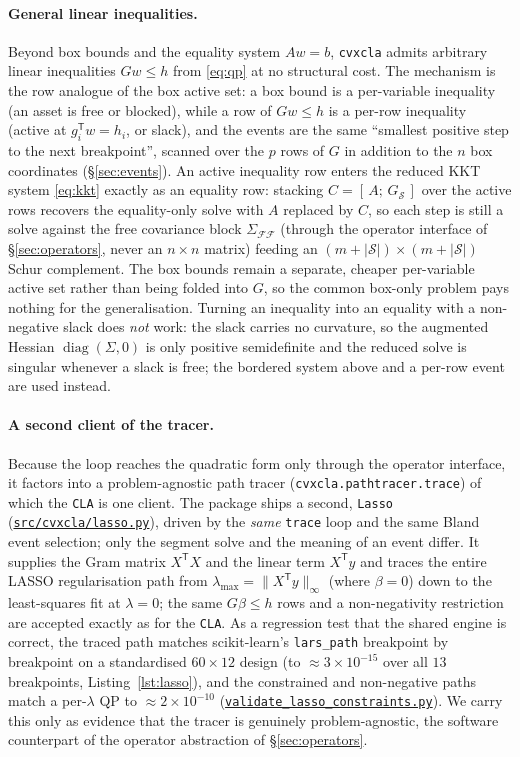 \documentclass[11pt]{article}
\newcommand{\Sig}{\Sigma}
\newcommand{\F}{\mathcal{F}}        %
\newcommand{\Sset}{\mathcal{S}}     %
\newcommand{\trans}{^{\mathsf{T}}}
\newcommand{\repourl}{https://github.com/cvxgrp/cvxcla}
\newcommand{\srcref}{v1.8.1}
\newcommand{\srcfile}[2]{\href{\repourl/blob/\srcref/#1}{\texttt{#2}}}
\begin{document}
\paragraph{General linear inequalities.} Beyond box bounds and the equality system
$A w = b$, \texttt{cvxcla} admits arbitrary linear inequalities $G w \le h$ from
\eqref{eq:qp} at no structural cost. The mechanism is the row analogue of the box active
set: a box bound is a per-variable inequality (an asset is free or blocked), while a row
of $G w \le h$ is a per-row inequality (active at $g_i\trans w = h_i$, or slack), and the
events are the same ``smallest positive step to the next breakpoint'', scanned over the
$p$ rows of $G$ in addition to the $n$ box coordinates (\S\ref{sec:events}). An active
inequality row enters the reduced KKT system \eqref{eq:kkt} exactly as an equality row:
stacking $C = [\,A;\,G_{\Sset}\,]$ over the active rows recovers the equality-only solve
with $A$ replaced by $C$, so each step is still a solve against the free covariance block
$\Sig_{\F\F}$ (through the operator interface of \S\ref{sec:operators}, never an
$n\times n$ matrix) feeding an $(m+|\Sset|)\times(m+|\Sset|)$ Schur complement. The box
bounds remain a separate, cheaper per-variable active set rather than being folded into
$G$, so the common box-only problem pays nothing for the generalisation. Turning an
inequality into an equality with a non-negative slack does \emph{not} work: the slack
carries no curvature, so the augmented Hessian $\operatorname{diag}(\Sig, 0)$ is only
positive semidefinite and the reduced solve is singular whenever a slack is free; the
bordered system above and a per-row event are used instead.

\paragraph{A second client of the tracer.} Because the loop reaches the quadratic form
only through the operator interface, it factors into a problem-agnostic path tracer
(\texttt{cvxcla.pathtracer.trace}) of which the \texttt{CLA} is one client. The package
ships a second, \texttt{Lasso} (\srcfile{src/cvxcla/lasso.py}{src/cvxcla/lasso.py}),
driven by the \emph{same} \texttt{trace} loop and the same Bland event selection; only
the segment solve and the meaning of an event differ. It supplies the Gram matrix
$X\trans X$ and the linear term $X\trans y$ and traces the entire LASSO regularisation
path from $\lambda_{\max} = \lVert X\trans y\rVert_\infty$ (where $\beta = 0$) down to
the least-squares fit at $\lambda = 0$; the same $G\beta \le h$ rows and a
non-negativity restriction are accepted exactly as for the \texttt{CLA}. As a regression
test that the shared engine is correct, the traced path matches scikit-learn's
\texttt{lars\_path} \citep{scikitlearn} breakpoint by breakpoint on a standardised
$60\times 12$ design (to $\approx 3\times 10^{-15}$ over all $13$ breakpoints,
Listing~\ref{lst:lasso}), and the constrained and non-negative paths match a
per-$\lambda$ QP to $\approx 2\times10^{-10}$
(\srcfile{experiments/validate_lasso_constraints.py}{validate\_lasso\_constraints.py}).
We carry this only as evidence that the tracer is genuinely problem-agnostic, the
software counterpart of the operator abstraction of \S\ref{sec:operators}.
\end{document}
